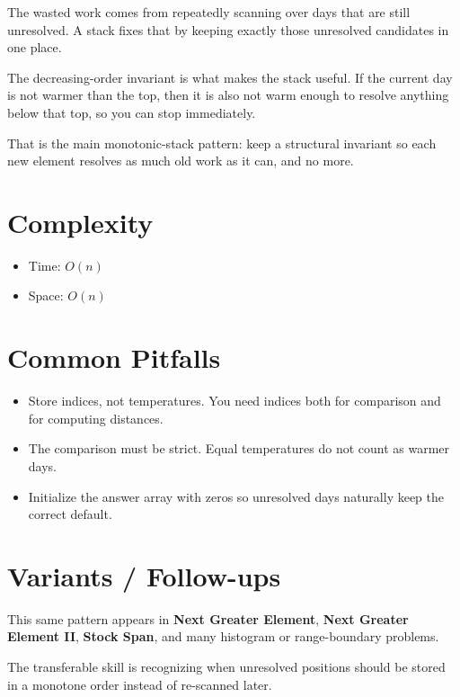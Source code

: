 The wasted work comes from repeatedly scanning over days that are still unresolved. A stack fixes that by keeping exactly those unresolved candidates in one place.

The decreasing-order invariant is what makes the stack useful. If the current day is not warmer than the top, then it is also not warm enough to resolve anything below that top, so you can stop immediately.

That is the main monotonic-stack pattern: keep a structural invariant so each new element resolves as much old work as it can, and no more.

\section{Complexity}
\begin{itemize}
\item Time: \(O(n)\)
\item Space: \(O(n)\)
\end{itemize}

\section{Common Pitfalls}
\begin{itemize}
\item Store indices, not temperatures. You need indices both for comparison and for computing distances.
\item The comparison must be strict. Equal temperatures do not count as warmer days.
\item Initialize the answer array with zeros so unresolved days naturally keep the correct default.
\end{itemize}

\section{Variants / Follow-ups}
This same pattern appears in \textbf{Next Greater Element}, \textbf{Next Greater Element II}, \textbf{Stock Span}, and many histogram or range-boundary problems.

The transferable skill is recognizing when unresolved positions should be stored in a monotone order instead of re-scanned later.

